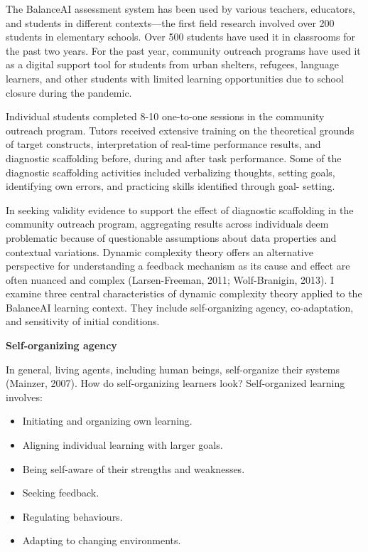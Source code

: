\documentclass[
]{book}
\begin{document}
The BalanceAI assessment system has been used by various teachers, educators, and students in different contexts---the first field research involved over 200 students in elementary schools. Over 500 students have used it in classrooms for the past two years. For the past year, community outreach programs have used it as a digital support tool for students from urban shelters, refugees, language learners, and other students with limited learning opportunities due to school closure during the pandemic.

Individual students completed 8-10 one-to-one sessions in the community outreach program. Tutors received extensive training on the theoretical grounds of target constructs, interpretation of real-time performance results, and diagnostic scaffolding before, during and after task performance. Some of the diagnostic scaffolding activities included verbalizing thoughts, setting goals, identifying own errors, and practicing skills identified through goal- setting.

In seeking validity evidence to support the effect of diagnostic scaffolding in the community outreach program, aggregating results across individuals deem problematic because of questionable assumptions about data properties and contextual variations. Dynamic complexity theory offers an alternative perspective for understanding a feedback mechanism as its cause and effect are often nuanced and complex (Larsen-Freeman, 2011; Wolf-Branigin, 2013). I examine three central characteristics of dynamic complexity theory applied to the BalanceAI learning context. They include self-organizing agency, co-adaptation, and sensitivity of initial conditions.

\textbf{Self-organizing agency}

In general, living agents, including human beings, self-organize their systems (Mainzer, 2007). How do self-organizing learners look? Self-organized learning involves:

\begin{itemize}
\item
  Initiating and organizing own learning.
\item
  Aligning individual learning with larger goals.
\item
  Being self-aware of their strengths and weaknesses.
\item
  Seeking feedback.
\item
  Regulating behaviours.
\item
  Adapting to changing environments.
\end{itemize}
\end{document}
